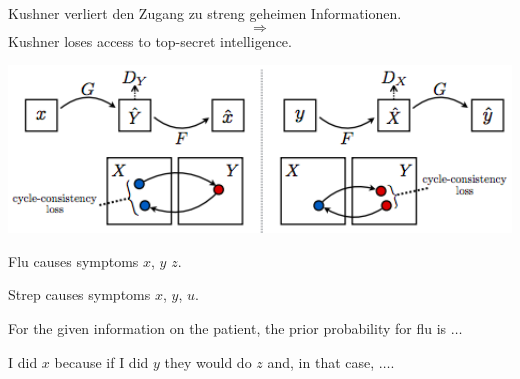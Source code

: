 {

Kushner verliert den Zugang zu streng geheimen Informationen.
$$\Rightarrow$$
Kushner loses access to top-secret intelligence.

\vfill
\centerline{\includegraphics[width = 6.0in]{../images/Cycle2}}


Flu causes symptoms $x$, $y$ $z$.

\vfill
Strep causes symptoms $x$, $y$, $u$.

\vfill
For the given information on the patient, the prior probability for flu is $\ldots$


I did $x$ because if I did $y$ they would do $z$ and, in that case, $\ldots$.










}

